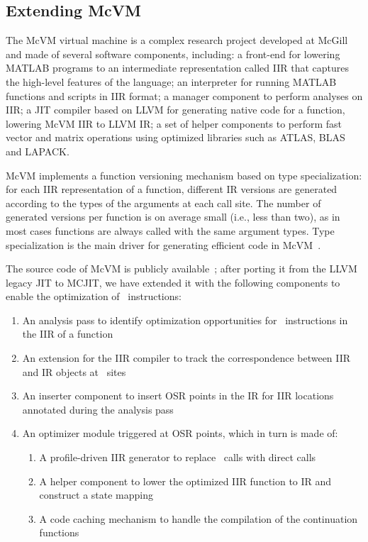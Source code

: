 \subsection{Extending McVM}
The McVM virtual machine is a complex research project developed at McGill and made of several software components, including: a front-end for lowering MATLAB programs to an intermediate representation called IIR that captures the high-level features of the language; an interpreter for running MATLAB functions and scripts in IIR format; a manager component to perform analyses on IIR; a JIT compiler based on LLVM for generating native code for a function, lowering McVM IIR to LLVM IR; a set of helper components to perform fast vector and matrix operations using optimized libraries such as ATLAS, BLAS and LAPACK. %

McVM implements a function versioning mechanism based on type specialization: for each IIR representation of a function, different IR versions are generated according to the types of the arguments at each call site. The number of generated versions per function is on average small (i.e., less than two), as in most cases functions are always called with the same argument types. Type specialization is the main driver for generating efficient code in McVM~\cite{chevalier2010mcvm}.

The source code of McVM is publicly available~\cite{mcvm}; after porting it from the LLVM legacy JIT to MCJIT, we have extended it with the following components to enable the optimization of \feval\ instructions:
\begin{enumerate}
\item An analysis pass to identify optimization opportunities for \feval\ instructions in the IIR of a function
\item An extension for the IIR compiler to track the correspondence between IIR and IR objects at \feval\ sites
\item An inserter component to insert OSR points in the IR for IIR locations annotated during the analysis pass
\item An optimizer module triggered at OSR points, which in turn is made of:
\begin{enumerate}
\item A profile-driven IIR generator to replace \feval\ calls with direct calls
\item A helper component to lower the optimized IIR function to IR and construct a state mapping 
\item A code caching mechanism to handle the compilation of the continuation functions
\end{enumerate}
\end{enumerate}

